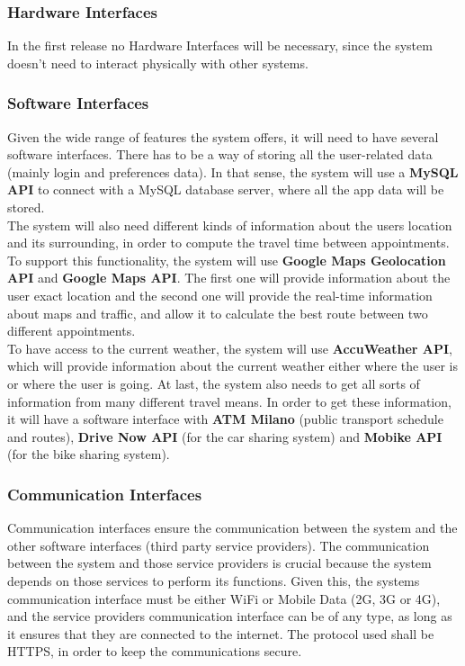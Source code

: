 \documentclass[12pt]{article}
\begin{document}
\subsubsection{Hardware Interfaces}
In the first release no Hardware Interfaces will be necessary, since the system doesn't need to interact physically with other systems.

\subsubsection{Software Interfaces}
Given the wide range of features the system offers, it will need to have several software interfaces. There has to be a way of storing all the user-related data (mainly login and preferences data). In that sense, the system will use a \textbf{MySQL API} to connect with a MySQL database server, where all the app data will be stored.\\
The system will also need different kinds of information about the users location and its surrounding, in order to compute the travel time between appointments. To support this functionality, the system will use \textbf{Google Maps Geolocation API} and \textbf{Google Maps API}. The first one will provide information about the user exact location and the second one will provide the real-time information about maps and traffic, and allow it to calculate the best route between two different appointments.\\
To have access to the current weather, the system will use \textbf{AccuWeather API}, which will provide information about the current weather either where the user is or where the user is going.
At last, the system also needs to get all sorts of information from many different travel means. In order to get these information, it will have a software interface with \textbf{ATM Milano} (public transport schedule and routes), \textbf{Drive Now API} (for the car sharing system) and \textbf{Mobike API} (for the bike sharing system).



\subsubsection{Communication Interfaces}
Communication interfaces ensure the communication between the system and the other software interfaces (third party service providers).
The communication between the system and those service providers is crucial because the system depends on those services to perform its functions. Given this, the systems communication interface must be either WiFi or Mobile Data (2G, 3G or 4G), and the service providers communication interface can be of any type, as long as it ensures that they are connected to the internet. The protocol used shall be HTTPS, in order to keep the communications secure.
\end{document}
